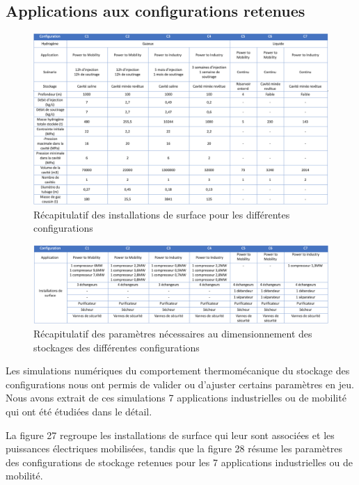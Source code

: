 \documentclass[11pt,french,a4paper]{article}
\begin{document}
\begin{multicols}{2}
\end{multicols}

\subsection{Applications aux configurations retenues}


\begin{figure}[!h]
  \centering
  \includegraphics[width=0.9\linewidth]{image/chap3/Tableau 1 chap 2.4.png}
  \caption{Récapitulatif des installations de surface pour les différentes configurations}
  \end{figure}


\begin{figure}[!h]
\centering
\includegraphics[width=0.9\linewidth]{image/chap3/Tableau 2 chap 2.4.png}
\caption{Récapitulatif des paramètres nécessaires au dimensionnement des stockages des différentes configurations }
\end{figure}

Les simulations numériques du comportement thermomécanique du stockage des configurations nous ont permis de valider ou d'ajuster certains paramètres en jeu. Nous avons extrait de ces simulations 7 applications industrielles ou de mobilité qui ont été étudiées dans le détail.

La figure 27 regroupe les installations de surface qui leur sont associées et les puissances électriques mobilisées, tandis que la figure 28 résume les paramètres des configurations de stockage retenues pour les 7 applications industrielles ou de mobilité.
\end{document}
